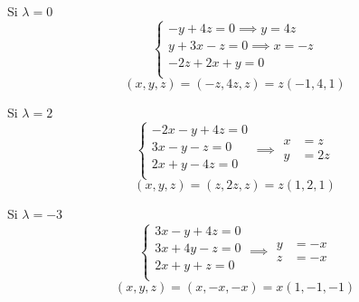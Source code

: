 \documentclass[../practica.root.tex]{subfiles}
\begin{document}
\begin{enumerate}
\[          \]
          \begin{minipage}[t]{0.5\textwidth}
              Si \( \lambda = 0 \)
              \[
                  \begin{cases}
                      -y + 4z = 0 \implies y = 4z    \\
                      y + 3x - z = 0 \implies x = -z \\
                      -2z + 2x + y = 0               \\
                  \end{cases}
              \] \[
                  (x, y, z) = (-z,4z,z) = z(-1,4,1)
              \]
          \end{minipage}
          \begin{minipage}[t]{0.5\textwidth}
              Si \( \lambda = 2 \)
              \[
                  \begin{cases}
                      -2x - y + 4z = 0 \\
                      3x - y -  z = 0  \\
                      2x + y - 4z = 0  \\
                  \end{cases}
                  \implies
                  \begin{array}{rl}
                      x & = z  \\
                      y & = 2z
                  \end{array}
              \] \[
                  (x, y, z) = (z,2z,z) = z(1,2,1)
              \]
          \end{minipage}
          \begin{minipage}[t]{0.5\textwidth}
              Si \( \lambda = -3 \)
              \[
                  \begin{cases}
                      3x -  y + 4z = 0 \\
                      3x + 4y -  z = 0 \\
                      2x +  y +  z = 0 \\
                  \end{cases}
                  \implies
                  \begin{array}{rl}
                      y & = -x \\
                      z & = -x
                  \end{array}
              \] \[
                  (x, y, z) = (x,-x,-x) = x(1,-1,-1)
              \]
          \end{minipage}

\end{enumerate}
\end{document}
